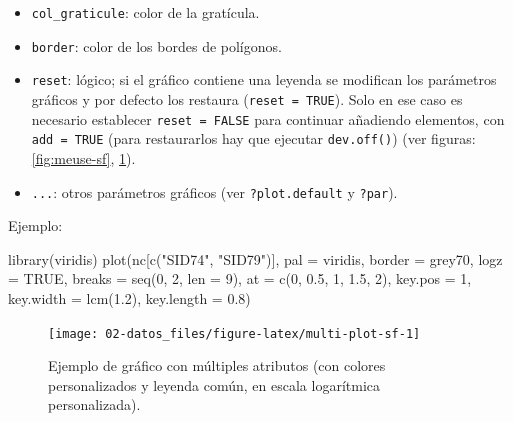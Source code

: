 \documentclass[
  spanish,
]{book}
\newenvironment{Shaded}{\begin{snugshade}}{\end{snugshade}}
\newcommand{\AttributeTok}[1]{\textcolor[rgb]{0.77,0.63,0.00}{#1}}
\newcommand{\ConstantTok}[1]{\textcolor[rgb]{0.00,0.00,0.00}{#1}}
\newcommand{\DecValTok}[1]{\textcolor[rgb]{0.00,0.00,0.81}{#1}}
\newcommand{\FloatTok}[1]{\textcolor[rgb]{0.00,0.00,0.81}{#1}}
\newcommand{\FunctionTok}[1]{\textcolor[rgb]{0.00,0.00,0.00}{#1}}
\newcommand{\NormalTok}[1]{#1}
\newcommand{\StringTok}[1]{\textcolor[rgb]{0.31,0.60,0.02}{#1}}
\theoremstyle{break}
\theoremstyle{definition}
\theoremstyle{definition}
\theoremstyle{definition}
\theoremstyle{definition}
\theoremstyle{remark}
\begin{document}
\begin{itemize}
\item
  \texttt{col\_graticule}: color de la gratícula.
\item
  \texttt{border}: color de los bordes de polígonos.
\item
  \texttt{reset}: lógico; si el gráfico contiene una leyenda se modifican los parámetros gráficos y por defecto los restaura (\texttt{reset\ =\ TRUE}). Solo en ese caso es necesario establecer \texttt{reset\ =\ FALSE} para continuar añadiendo elementos, con \texttt{add\ =\ TRUE} (para restaurarlos hay que ejecutar \texttt{dev.off()}) (ver figuras: \ref{fig:meuse-sf}, \ref{fig:multi-plot-sf}).
\item
  \texttt{...}: otros parámetros gráficos (ver \texttt{?plot.default} y \texttt{?par}).
\end{itemize}

Ejemplo:

\begin{Shaded}
\begin{Highlighting}[]
\FunctionTok{library}\NormalTok{(viridis)}
\FunctionTok{plot}\NormalTok{(nc[}\FunctionTok{c}\NormalTok{(}\StringTok{"SID74"}\NormalTok{, }\StringTok{"SID79"}\NormalTok{)], }\AttributeTok{pal =}\NormalTok{ viridis, }\AttributeTok{border =} \StringTok{\textquotesingle{}grey70\textquotesingle{}}\NormalTok{, }\AttributeTok{logz =} \ConstantTok{TRUE}\NormalTok{, }
     \AttributeTok{breaks =} \FunctionTok{seq}\NormalTok{(}\DecValTok{0}\NormalTok{, }\DecValTok{2}\NormalTok{, }\AttributeTok{len =} \DecValTok{9}\NormalTok{), }\AttributeTok{at =} \FunctionTok{c}\NormalTok{(}\DecValTok{0}\NormalTok{, }\FloatTok{0.5}\NormalTok{, }\DecValTok{1}\NormalTok{, }\FloatTok{1.5}\NormalTok{, }\DecValTok{2}\NormalTok{), }
     \AttributeTok{key.pos =} \DecValTok{1}\NormalTok{, }\AttributeTok{key.width =} \FunctionTok{lcm}\NormalTok{(}\FloatTok{1.2}\NormalTok{), }\AttributeTok{key.length =} \FloatTok{0.8}\NormalTok{) }
\end{Highlighting}
\end{Shaded}

\begin{figure}[!htb]

{\centering \texttt{[image: 02-datos\_files/figure-latex/multi-plot-sf-1]} 

}

\caption{Ejemplo de gráfico con múltiples atributos (con colores personalizados y leyenda común, en escala logarítmica personalizada).}\label{fig:multi-plot-sf}
\end{figure}
\end{document}
